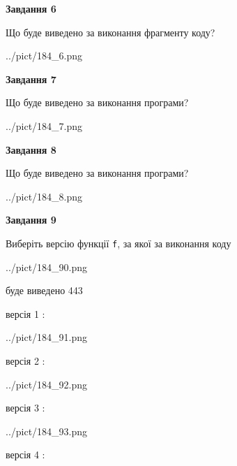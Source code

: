 \documentclass[12pt, ukrainian]{article}
\def\code#1{\Verb!#1!}
\begin{document}
{\begin {large}
{\begin {center}\textbf{Завдання 6}\end {center}}

Що буде виведено за виконання фрагменту коду?\par
\begin{center}
	{../pict/184_6.png}
\end{center}
\newpage

{\begin {center}\textbf{Завдання 7}\end {center}}

Що буде виведено за виконання програми?\par
\begin{center}
	{../pict/184_7.png}
\end{center}
\newpage

{\begin {center}\textbf{Завдання 8}\end {center}}

Що буде виведено за виконання програми?\par
\begin{center}
	{../pict/184_8.png}
\end{center}
\newpage

{\begin {center}\textbf{Завдання 9}\end {center}}

Виберіть версію функції \code{f}, за якої за виконання коду
\begin{center}
	{../pict/184_90.png}
\end{center}
буде виведено 443

\vspace{5mm}
версія 1 :

\begin{center}
	{../pict/184_91.png}
\end{center}
версія 2 :

\begin{center}
	{../pict/184_92.png}
\end{center}
версія 3 :

\begin{center}
	{../pict/184_93.png}
\end{center}
версія 4 :


\end{large}}
\end{document}
